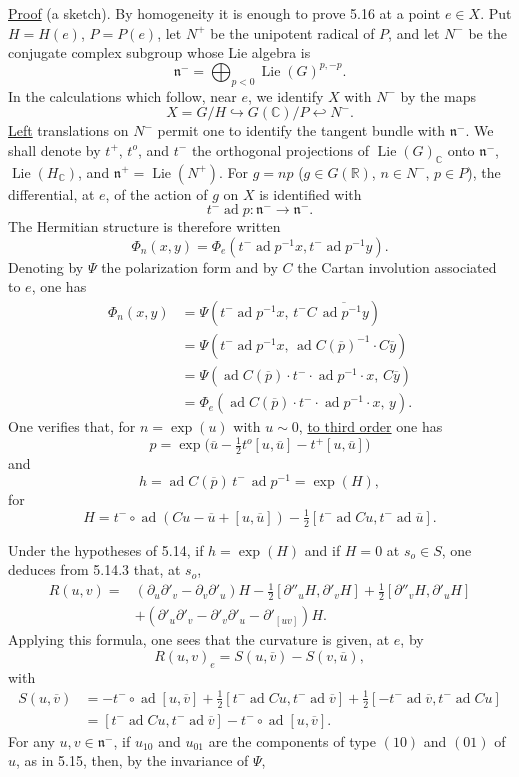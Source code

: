\documentclass[10pt,leqno]{article}
\newcommand{\C}{\mathbb C}
\newcommand{\R}{\mathbb R}
\theoremstyle{deligne}
\newcommand{\Lie}{\operatorname{Lie}}
\newcommand{\ad}{\operatorname{ad}}
\renewcommand{\underline}[1]{\uline{#1}}
\begin{document}
\underline{Proof} (a sketch). By homogeneity it is enough to prove 5.16 at a point $e\in X$. Put $H=H(e)$, $P=P(e)$, let $N^+$ be the unipotent radical of $P$, and let $N^-$ be the conjugate complex subgroup whose Lie algebra is
\[
  \mathfrak n^-=\bigoplus_{p<0}\Lie(G)^{p,-p}.
\]
In the calculations which follow, near $e$, we identify $X$ with $N^-$ by the maps
\[
  X=G/H \hookrightarrow G(\C)/P \hookleftarrow N^-.
\]
\underline{Left} translations on $N^-$ permit one to identify the tangent bundle with $\mathfrak n^-$. We shall denote by $t^+$, $t^o$, and $t^-$ the orthogonal projections of $\Lie(G)_\C$ onto $\mathfrak n^-$, $\Lie(H_\C)$, and $\mathfrak n^+=\Lie(N^+)$. For $g=np$ ($g\in G(\R)$, $n\in N^-$, $p\in P$), the differential, at $e$, of the action of $g$ on $X$ is identified with
\[
  t^-\ad p:\mathfrak n^-\longrightarrow \mathfrak n^- .
\]
The Hermitian structure is therefore written
\[
  \Phi_n(x,y)=\Phi_e(t^-\ad p^{-1}x,t^-\ad p^{-1}y).
\]
Denoting by $\Psi$ the polarization form and by $C$ the Cartan involution associated to $e$, one has
\[
\begin{aligned}
 \Phi_n(x,y)
 &=\Psi(t^-\ad p^{-1}x,\,t^- C\,\overline{\ad p^{-1}y})\\
 &=\Psi(t^-\ad p^{-1}x,\,\ad C(\overline p)^{-1}\cdot C\overline y)\\
 &=\Psi(\ad C(\overline p)\cdot t^-\cdot\ad p^{-1}\cdot x,\,C\overline y)\\
 &=\Phi_e(\ad C(\overline p)\cdot t^-\cdot\ad p^{-1}\cdot x,\,y).
\end{aligned}
\]
One verifies that, for $n=\exp(u)$ with $u\sim0$, \underline{to third order} one has
\[
  p=\exp\bigl(\overline u-\tfrac12t^o[u,\overline u]-t^+[u,\overline u]\bigr)
\]
and
\[
  h=\ad C(\overline p)\,t^-\,\ad p^{-1}=\exp(H),
\]
for
\[
  H=t^-\circ\ad(Cu-\overline u+[u,\overline u])
  -\tfrac12[t^-\ad Cu,t^-\ad\overline u].
\]

Under the hypotheses of 5.14, if $h=\exp(H)$ and if $H=0$ at $s_o\in S$, one deduces from 5.14.3 that, at $s_o$,
\[
\begin{aligned}
R(u,v)
={}&(\partial_u\partial'_v-\partial_v\partial'_u)H
-\tfrac12[\partial''_uH,\partial'_vH]
+\tfrac12[\partial''_vH,\partial'_uH]\\
&+(\partial'_u\partial'_v-\partial'_v\partial'_u-\partial'_{[uv]})H .
\end{aligned}
\]
Applying this formula, one sees that the curvature is given, at $e$, by
\[
  R(u,v)_e=S(u,\overline v)-S(v,\overline u),
\]
with
\[
\begin{aligned}
S(u,\overline v)
&=-t^-\circ\ad[u,\overline v]
+\tfrac12[t^-\ad Cu,t^-\ad\overline v]
+\tfrac12[-t^-\ad\overline v,t^-\ad Cu]\\
&=[t^-\ad Cu,t^-\ad\overline v]
-t^-\circ\ad[u,\overline v].
\end{aligned}
\]
For any $u,v\in\mathfrak n^-$, if $u_{10}$ and $u_{01}$ are the components of type $(10)$ and $(01)$ of $u$, as in 5.15, then, by the invariance of $\Psi$,
\end{document}
